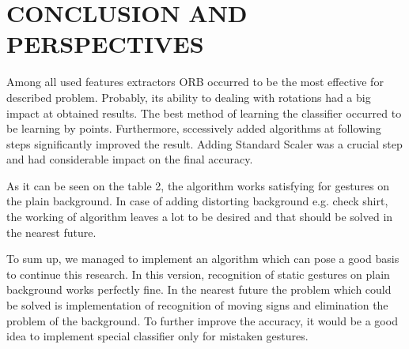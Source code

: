 \documentclass[11pt,a4paper]{article}
\begin{document}
\section{CONCLUSION AND PERSPECTIVES}

Among all used features extractors ORB occurred to be the most effective for described problem. Probably, its ability to dealing with rotations had a big impact at obtained results. The best method of learning the classifier occurred to be learning by points. Furthermore, sccessively added algorithms at following steps significantly improved the result. Adding Standard Scaler was a crucial step and had considerable impact on the final accuracy.

As it can be seen on the table 2, the algorithm works satisfying for gestures on the plain background. In case of adding distorting background e.g. check shirt, the working of algorithm leaves a lot to be desired and that should be solved in the nearest future.

To sum up, we managed to implement an algorithm which can pose a good basis to continue this research. In this version, recognition of static gestures on plain background works perfectly fine. In the nearest future the problem which could be solved is implementation of recognition of moving signs and elimination the problem of the background. To further improve the accuracy, it would be a good idea to implement special classifier only for mistaken gestures.




\end{document}
